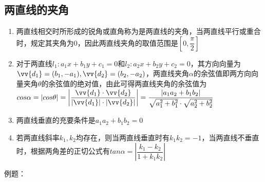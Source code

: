\subsection*{两直线的夹角}
\begin{enumerate}
    \item 两直线相交时所形成的锐角或直角称为是两直线的夹角，当两直线平行或重合时，规定其夹角为0，因此两直线夹角的取值范围是$\left[0, \dfrac{\pi}{2}\right]$
    \item 对于两直线$l_1:a_1 x + b_1y + c_1 = 0$和$l_2:a_2x+b_2y+c_2 = 0$，其方向向量为$\vv{d_1} = (b_1, -a_1), \vv{d_2} = (b_2, -a_2)$，两直线夹角$\alpha$的余弦值即两方向向量夹角$\theta$的余弦值的绝对值，由此可得两直线夹角的余弦值为$cos\alpha = |cos\theta| = \left|\dfrac{\vv{d_1} \cdot \vv{d_2}}{|\vv{d_1}| \cdot |\vv{d_2}|}\right| = \dfrac{|a_1a_2 + b_1b_2|}{\sqrt{a_1^2+b_1^2} \cdot \sqrt{a_2^2+b_2^2}}$
    \item 两直线垂直的充要条件是$a_1a_2 + b_1b_2 = 0$
    \item 若两直线斜率$k_1, k_2$均存在，则当两直线垂直时有$k_1k_2 = -1$，当两直线不垂直时，根据两角差的正切公式有$tan\alpha = \left|\dfrac{k_1 - k_2}{1+k_1k_2}\right|$
\end{enumerate}
例题：
